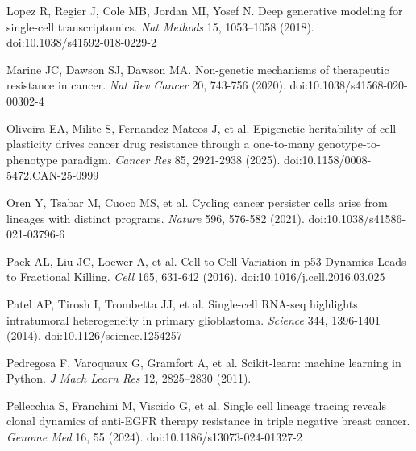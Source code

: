 \documentclass[11pt,a4paper]{article}
\begin{document}
\noindent Lopez R, Regier J, Cole MB, Jordan MI, Yosef N. Deep generative modeling for single-cell transcriptomics. \emph{Nat Methods} 15, 1053--1058 (2018). doi:10.1038/s41592-018-0229-2\par\vspace{2pt}

\noindent Marine JC, Dawson SJ, Dawson MA. Non-genetic mechanisms of therapeutic resistance in cancer. \emph{Nat Rev Cancer} 20, 743-756 (2020). doi:10.1038/s41568-020-00302-4\par\vspace{2pt}

\noindent Oliveira EA, Milite S, Fernandez-Mateos J, et al. Epigenetic heritability of cell plasticity drives cancer drug resistance through a one-to-many genotype-to-phenotype paradigm. \emph{Cancer Res} 85, 2921-2938 (2025). doi:10.1158/0008-5472.CAN-25-0999 \par\vspace{2pt}

\noindent Oren Y, Tsabar M, Cuoco MS, et al. Cycling cancer persister cells arise from lineages with distinct programs. \emph{Nature} 596, 576-582 (2021). doi:10.1038/s41586-021-03796-6 \par\vspace{2pt}

\noindent Paek AL, Liu JC, Loewer A, et al. Cell-to-Cell Variation in p53 Dynamics Leads to Fractional Killing. \emph{Cell} 165, 631-642 (2016). doi:10.1016/j.cell.2016.03.025 \par\vspace{2pt}

\noindent Patel AP, Tirosh I, Trombetta JJ, et al. Single-cell RNA-seq highlights intratumoral heterogeneity in primary glioblastoma. \emph{Science} 344, 1396-1401 (2014). doi:10.1126/science.1254257 \par\vspace{2pt}

\noindent Pedregosa F, Varoquaux G, Gramfort A, et al. Scikit-learn: machine learning in Python. \emph{J Mach Learn Res} 12, 2825--2830 (2011).\par\vspace{2pt}

\noindent Pellecchia S, Franchini M, Viscido G, et al. Single cell lineage tracing reveals clonal dynamics of anti-EGFR therapy resistance in triple negative breast cancer. \emph{Genome Med} 16, 55 (2024). doi:10.1186/s13073-024-01327-2 \par\vspace{2pt}
\end{document}
